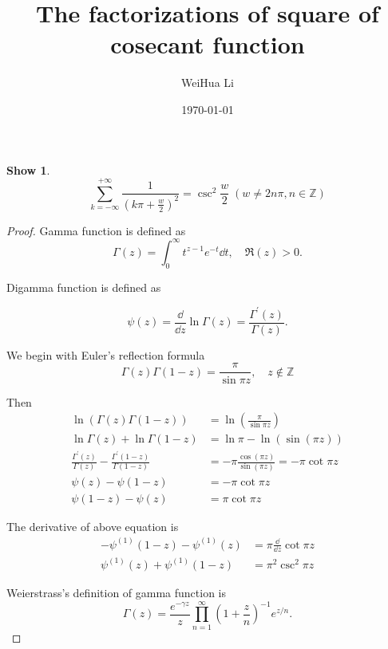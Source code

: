 \documentclass{article}
\title{The factorizations of square of cosecant function}
\author{WeiHua Li}
\date{\today}
\theoremstyle{plain}
\newtheorem*{theorem*}{Show}
\begin{document}
\maketitle

\begin{theorem*}
\begin{equation} \label{eq:0}
\sum_{k=-\infty}^{+\infty} \frac{1}{(k\pi + \frac{w}{2})^2} = \csc^2 \frac{w}{2}  \; (w \ne 2n\pi, n\in \mathbb{Z})
\end{equation}
\end{theorem*}

\begin{proof}

Gamma function is defined as
\begin{equation}
   \Gamma(z) = \int_{0}^{\infty} t^{z-1} e^{-t} \dd t,\quad \mathfrak{R}(z) > 0.
\end{equation}

Digamma function is defined as

\begin{equation}
   \psi(z) = \frac{\dd}{\dd z} \ln\Gamma(z) = \frac{\Gamma^{'}(z)}{\Gamma(z)}.
\end{equation}

We begin with Euler's reflection formula
\begin{equation}
    \Gamma(z) \Gamma(1-z) = \frac{\pi}{\sin\pi z}, \quad z \notin \mathbb{Z}
\end{equation}

Then
\begin{align*}
\ln (\Gamma(z) \Gamma(1-z)) &= \ln(\frac{\pi}{\sin \pi z}) \\
\ln\Gamma(z) + \ln\Gamma(1-z) &= \ln\pi - \ln(\sin(\pi z)) \\
\frac{\Gamma^{'}(z)}{\Gamma(z)} - \frac{\Gamma^{'}(1-z)}{\Gamma(1-z)}
&=  - \pi \frac{\cos(\pi z)}{\sin(\pi z)} = -\pi \cot\pi z \\
\psi(z) - \psi(1-z) &= -\pi \cot \pi z \\
\psi(1-z) - \psi(z) &= \pi \cot \pi z
\end{align*}

The derivative of above equation is
\begin{align*}
- \psi^{(1)}(1-z) - \psi^{(1)}(z) &= \pi \frac{\dd}{\dd z} \cot \pi z \\
\psi^{(1)}(z) + \psi^{(1)}(1-z) &= \pi^2 \csc^2 \pi z
\end{align*}


Weierstrass's definition of gamma function is
\begin{equation}
\Gamma(z) = \frac{e^{-\gamma z}}{z}  \prod_{n=1}^{\infty} \left(1 + \frac{z}{n} \right)^{-1} e^{z/n} .
\end{equation}


\end{proof}
\end{document}
